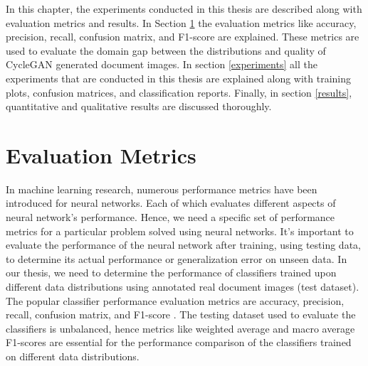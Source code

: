 \justifying
\setlength{\parskip}{1em}

In this chapter, the experiments conducted in this thesis are described along with evaluation metrics and results. In Section \ref{EvaluationMetrics} the evaluation metrics like accuracy, precision, recall, confusion matrix, and F1-score are explained. These metrics are used to evaluate the domain gap between the distributions and quality of \ac{CycleGAN} generated document images. In section \ref{experiments} all the experiments that are conducted in this thesis are explained along with training plots, confusion matrices, and classification reports. Finally, in section \ref{results}, quantitative and qualitative results are discussed thoroughly.

\section{Evaluation Metrics}\label{EvaluationMetrics}


In machine learning research, numerous performance metrics have been introduced for neural networks. Each of which evaluates different aspects of neural network's performance. Hence, we need a specific set of performance metrics for a particular problem solved using neural networks. It's important to evaluate the performance of the neural network after training, using testing data, to determine its actual performance or generalization error on unseen data. In our thesis, we need to determine the performance of classifiers trained upon different data distributions using annotated real document images (test dataset). The popular classifier performance evaluation metrics are accuracy, precision, recall, confusion matrix, and F1-score \cite{powers2020evaluation}. The testing dataset used to evaluate the classifiers is unbalanced, hence metrics like weighted average and macro average F1-scores are essential for the performance comparison of the classifiers trained on different data distributions. 

